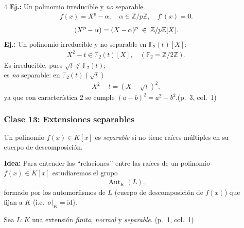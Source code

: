 \documentclass[landscape,a4paper]{article}
\begin{document}
\begin{multicols}{4}
\textbf{Ej.:}\; Un polinomio irreducible y \emph{no} separable.\\
\begin{align*}
f(x)=X^{p}-\alpha,\quad \alpha\in\mathbb{Z}/p\mathbb{Z},\quad f'(x)=0.
\end{align*}
\begin{align*}
  (X^{p}-\alpha)^{\vphantom{p}}=(X-\alpha)^{p}\;\in\;\mathbb{Z}/p\mathbb{Z}[X].
\end{align*}
\medskip
\textbf{Ej.:}\; Un polinomio irreducible y no separable en $\mathbb{F}_{2}(t)[X]$:\;
\begin{align*}
X^{2}-t\in\mathbb{F}_{2}(t)[X],\quad(\mathbb{F}_{2}=\mathbb{Z}/2\mathbb{Z}).
\end{align*}
\noindent Es irreducible, pues $\sqrt{t}\notin\mathbb{F}_{2}(t)$;\\
es \emph{no} separable: en $\mathbb{F}_{2}(t)(\sqrt{t})$
\begin{align*}
X^{2}-t=(X-\sqrt{t})^{2},
\end{align*}
ya que con característica $2$ se cumple $(a-b)^{2}=a^{2}-b^{2}$.\hfill(p.~3, col.~1)
\subsubsection*{Clase 13: Extensiones separables}
\begin{tcolorbox}[colback=white,colframe=blue!80!black,
                  colbacktitle=blue!80!black,coltitle=white,
                  title=Definición: {Polinomio separable (p.~1, col.~1)}]
Un polinomio $f(x)\in K[x]$ es \emph{separable} si no tiene raíces múltiples en su cuerpo de descomposición.
\end{tcolorbox}

\noindent \textbf{Idea:} Para entender las “relaciones’’ entre las raíces de un polinomio $f(x)\in K[x]$ estudiaremos el grupo
\begin{align}
\operatorname{Aut}_{K}(L), \tag*{(p.~1, col.~1)}
\end{align}
formado por los automorfismos de $L$ (cuerpo de descomposición de $f(x)$) que fijan a $K$ (i.e.\ $\sigma|_{K}=\mathrm{id}$).

Sea $L:K$ una extensión \emph{finita}, \emph{normal} y \emph{separable}. (p.~1, col.~1)


\end{multicols}
\end{document}
